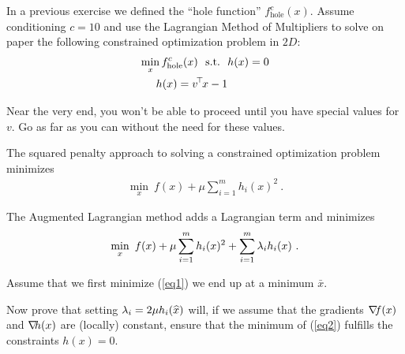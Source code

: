 

\renewcommand{\course}{Maths for Intelligent Systems}
\renewcommand{\coursedate}{Summer 2019}

\renewcommand{\exnum}{Exercise 7}

\exercises


\exercisestitle



In a previous exercise we defined the ``hole function'' $f^c_{\text{hole}}(x)$. Assume conditioning $c=10$ and use the Lagrangian Method of Multipliers to
solve on paper the following constrained optimization problem in $2D$:
\begin{align}
\min_x f^c_{\text{hole}}(x) ~~\text{s.t.}~~& h(x)=0 \\
h(x) = v^{\!\top\!} x - 1
\end{align}

Near the very end, you won't be able to proceed until you have special values
for $v$. Go as far as you can without the need for these values.




The squared penalty approach to solving a constrained optimization problem minimizes
\begin{align}
\min_x~ f(x) + \mu \sum_{i=1}^m h_i(x)^2 ~. \label{eq1}
\end{align}

The Augmented Lagrangian method adds a Lagrangian term and minimizes
\begin{align}
\min_x~ f(x) + \mu \sum_{i=1}^m h_i(x)^2 + \sum_{i=1}^m \lambda_i h_i(x)
~.\label{eq2}
\end{align}

Assume that we first minimize (\ref{eq1}) we end up at a minimum $\bar{x}$.

Now prove that setting $\lambda_i = 2\mu h_i(\widehat{x})$ will, if we assume
that the gradients ${\nabla_{\!\!}} f(x)$ and ${\nabla_{\!\!}} h(x)$ are (locally) constant,
ensure that the minimum of (\ref{eq2}) fulfills the constraints
$h(x)=0$.





\exerfoot
